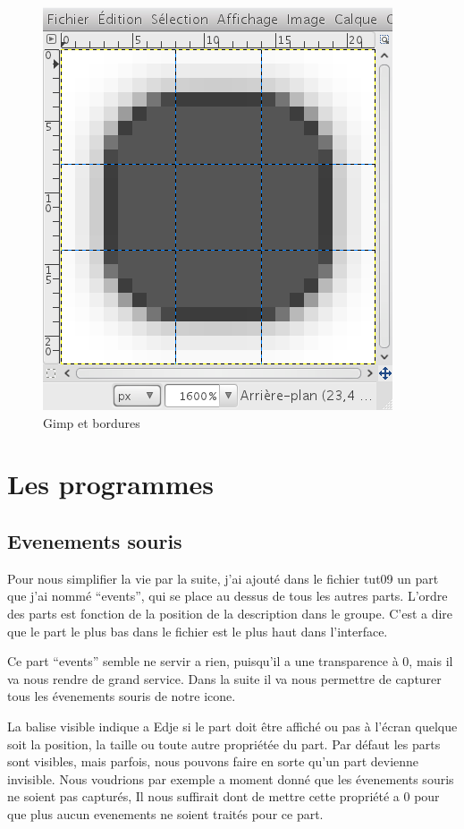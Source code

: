 \documentclass[a4paper]{efr}
\begin{document}
\begin{figure}
  \begin{center}
    \includegraphics[scale=0.5]{images/border2.png}
  \end{center}
  \caption{Gimp et bordures}
\end{figure}



\section{Les programmes}

\subsection{Evenements souris}

Pour nous simplifier la vie par la suite, j'ai ajouté dans le fichier tut09
un part que j'ai nommé ``events'', qui se place au dessus de tous les autres
parts. L'ordre des parts est fonction de la position de la description dans le
groupe. C'est a dire que le part le plus bas dans le fichier est le plus haut
dans l'interface.

Ce part ``events'' semble ne servir a rien, puisqu'il a une transparence à 0,
mais il va nous rendre de grand service. Dans la suite il va nous permettre de
capturer tous les évenements souris de notre icone.

La balise visible indique a Edje si le part doit être affiché ou pas à l'écran
quelque soit la position, la taille ou toute autre propriétée du part.
Par défaut les parts sont visibles, mais parfois, nous pouvons faire en sorte
qu'un part devienne invisible. Nous voudrions par exemple a moment donné que
les évenements souris ne soient pas capturés, Il nous suffirait dont de mettre
cette propriété a 0 pour que plus aucun evenements ne soient traités pour ce
part.
\end{document}

